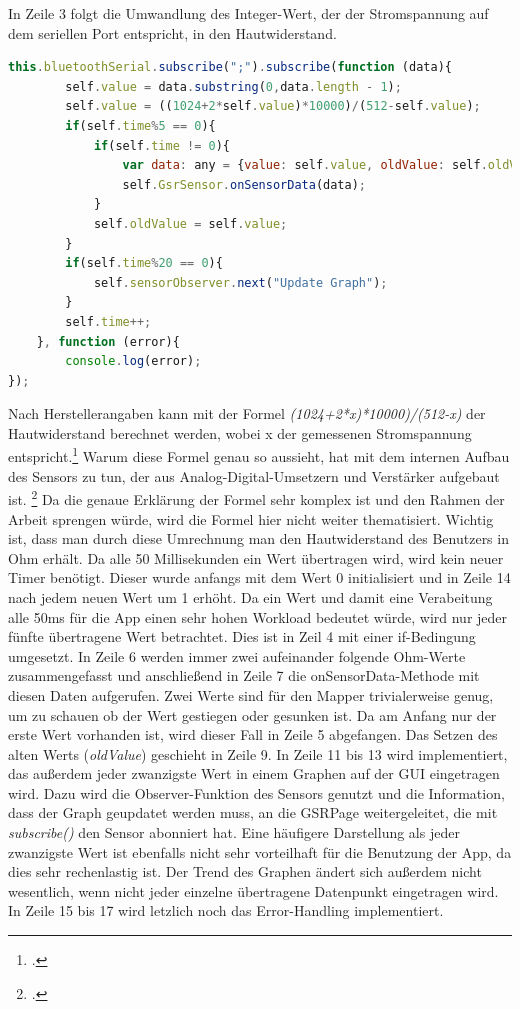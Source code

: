 In Zeile 3 folgt die Umwandlung des Integer-Wert, der der Stromspannung auf dem seriellen Port entspricht, in den Hautwiderstand. \newline
\begin{lstlisting}[caption={Verarbeitung der Sensordaten}, language=JavaScript]
this.bluetoothSerial.subscribe(";").subscribe(function (data){
		self.value = data.substring(0,data.length - 1);
		self.value = ((1024+2*self.value)*10000)/(512-self.value);
		if(self.time%5 == 0){
			if(self.time != 0){
				var data: any = {value: self.value, oldValue: self.oldValue};
				self.GsrSensor.onSensorData(data);
			}
			self.oldValue = self.value;
		} 
		if(self.time%20 == 0){
			self.sensorObserver.next("Update Graph");
		}
		self.time++;
	}, function (error){
		console.log(error);
});
\end{lstlisting}
Nach Herstellerangaben kann mit der Formel \textit{(1024+2*x)*10000)/(512-x)} der Hautwiderstand berechnet werden, wobei x der gemessenen Stromspannung entspricht.\footcite[Vgl.][]{Gro18} Warum diese Formel genau so aussieht, hat mit dem internen Aufbau des Sensors zu tun, der aus Analog-Digital-Umsetzern und Verstärker aufgebaut ist. \footcite[Vgl.][1. Forumsantwort]{Com18} Da die genaue Erklärung der Formel sehr komplex ist und den Rahmen der Arbeit sprengen würde, wird die Formel hier nicht weiter thematisiert. Wichtig ist, dass man durch diese Umrechnung man den Hautwiderstand des Benutzers in Ohm erhält. \newline
Da alle 50 Millisekunden ein Wert übertragen wird, wird kein neuer Timer benötigt. Dieser wurde anfangs mit dem Wert 0 initialisiert und in Zeile 14 nach jedem neuen Wert um 1 erhöht. Da ein Wert und damit eine Verabeitung alle 50ms für die App einen sehr hohen Workload bedeutet würde, wird nur jeder fünfte übertragene Wert betrachtet. Dies ist in Zeil 4 mit einer if-Bedingung umgesetzt. In Zeile 6 werden immer zwei aufeinander folgende Ohm-Werte zusammengefasst und anschließend in Zeile 7 die onSensorData-Methode mit diesen Daten aufgerufen. Zwei Werte sind für den Mapper trivialerweise genug, um zu schauen ob der Wert gestiegen oder gesunken ist. Da am Anfang nur der erste Wert vorhanden ist, wird dieser Fall in Zeile 5 abgefangen. Das Setzen des alten Werts (\textit{oldValue}) geschieht in Zeile 9. \newline
In Zeile 11 bis 13 wird implementiert, das außerdem jeder zwanzigste Wert in einem Graphen auf der GUI eingetragen wird. Dazu wird die Observer-Funktion des Sensors genutzt und die Information, dass der Graph geupdatet werden muss, an die GSRPage weitergeleitet, die mit \textit{subscribe()} den Sensor abonniert hat. Eine häufigere Darstellung als jeder zwanzigste Wert ist ebenfalls nicht sehr vorteilhaft für die Benutzung der App, da dies sehr rechenlastig ist. Der Trend des Graphen ändert sich außerdem nicht wesentlich, wenn nicht jeder einzelne übertragene Datenpunkt eingetragen wird. In Zeile 15 bis 17 wird letzlich noch das Error-Handling implementiert. \newline
